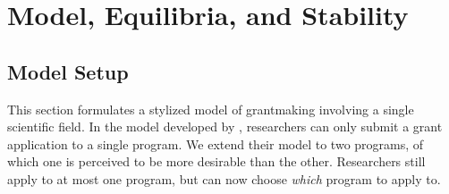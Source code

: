 \documentclass[12pt,reqno]{amsart}
\theoremstyle{definition}
\theoremstyle{plain} %
\begin{document}
\newpage

\section{Model, Equilibria, and Stability}\label{section:model}

\subsection{Model Setup}

\noindent This section formulates a stylized model of grantmaking involving a single scientific field. In the model developed by \citet{adda2024grantmaking}, researchers can only submit a grant application to a single program. We extend their model to two programs, of which one is perceived to be more desirable than the other. Researchers still apply to at most one program, but can now choose \textit{which} program to apply to.


\end{document}
